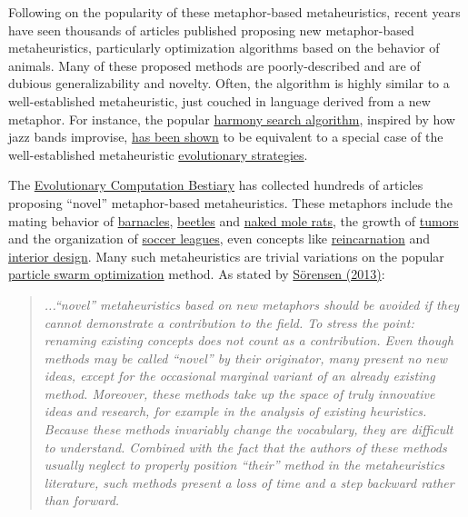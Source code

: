 \documentclass[letterpaper, 12pt]{article}
\begin{document}
Following on the popularity of these metaphor-based metaheuristics, recent years have seen thousands of articles published proposing new metaphor-based metaheuristics, particularly optimization algorithms based on the behavior of animals. Many of these proposed methods are poorly-described and are of dubious generalizability and novelty. Often, the algorithm is highly similar to a well-established metaheuristic, just couched in language derived from a new metaphor. For instance, the popular \href{https://doi.org/10.1177/003754970107600201}{harmony search algorithm}, inspired by how jazz bands improvise, \href{https://doi.org/10.4018/978-1-4666-0270-0.ch005}{has been shown} to be equivalent to a special case of the well-established metaheuristic \href{https://en.wikipedia.org/wiki/Evolution_strategy}{evolutionary strategies}.

The \href{https://fcampelo.github.io/EC-Bestiary/}{Evolutionary Computation Bestiary} has collected hundreds of articles proposing ``novel'' metaphor-based metaheuristics. These metaphors include the mating behavior of \href{https://doi.org/10.1007/978-981-13-3708-6_18}{barnacles}, \href{https://doi.org/10.1088/1757-899x/782/5/052028}{beetles} and \href{https://doi.org/10.1007/s00521-019-04464-7}{naked mole rats}, the growth of \href{https://doi.org/10.1016/j.asoc.2015.07.045}{tumors} and the organization of \href{http://dx.doi.org/10.4236/ijis.2014.41002}{soccer leagues}, even concepts like \href{https://doi.org/10.1109/CINTI.2010.5672231}{reincarnation} and \href{https://doi.org/10.1016/j.isatra.2014.03.018}{interior design}. Many such metaheuristics are trivial variations on the popular \href{https://en.wikipedia.org/wiki/Particle_swarm_optimization}{particle swarm optimization} method. As stated by \href{https://doi.org/10.1111/itor.12001}{S\"orensen (2013)}:

\begin{quote}
    \textit{...``novel'' metaheuristics based on new metaphors should be avoided if they cannot demonstrate a contribution to the field. To stress the point: renaming existing concepts does not count as a contribution. Even though methods may be called ``novel'' by their originator, many present no new ideas, except for the occasional marginal variant of an already existing method. Moreover, these methods take up the space of truly innovative ideas and research, for example in the analysis of existing heuristics. Because these methods invariably change the vocabulary, they are difficult to understand. Combined with the fact that the authors of these methods usually neglect to properly position ``their'' method in the metaheuristics literature, such methods present a loss of time and a step backward rather than forward.}
\end{quote}
\end{document}
